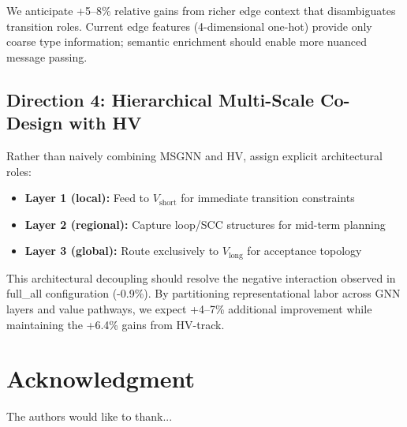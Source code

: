 \documentclass[journal]{IEEEtran}
\begin{document}
We anticipate +5--8\% relative gains from richer edge context that disambiguates transition roles. Current edge features (4-dimensional one-hot) provide only coarse type information; semantic enrichment should enable more nuanced message passing.

\subsection{Direction 4: Hierarchical Multi-Scale Co-Design with HV}

Rather than naively combining MSGNN and HV, assign explicit architectural roles:
\begin{itemize}
\item \textbf{Layer 1 (local):} Feed to $V_{\text{short}}$ for immediate transition constraints
\item \textbf{Layer 2 (regional):} Capture loop/SCC structures for mid-term planning
\item \textbf{Layer 3 (global):} Route exclusively to $V_{\text{long}}$ for acceptance topology
\end{itemize}

This architectural decoupling should resolve the negative interaction observed in full\_all configuration (-0.9\%). By partitioning representational labor across GNN layers and value pathways, we expect +4--7\% additional improvement while maintaining the +6.4\% gains from HV-track.

\section*{Acknowledgment}


The authors would like to thank...


\ifCLASSOPTIONcaptionsoff
  \newpage
\fi







%
\end{document}
